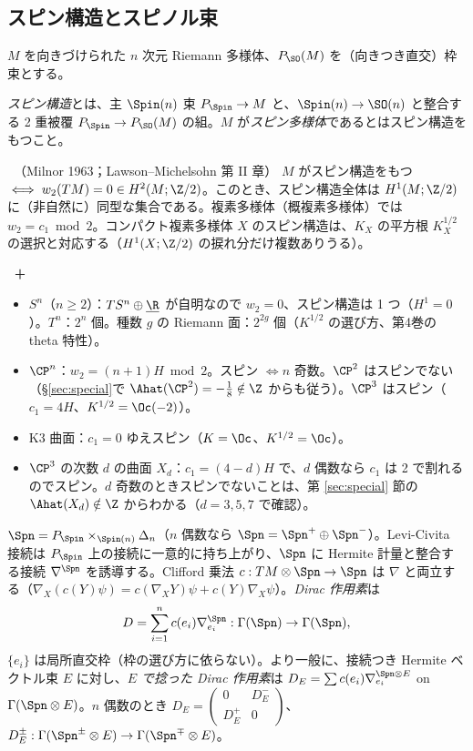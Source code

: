 \subsection{スピン構造とスピノル束}
$M$ を向きづけられた $n$ 次元 Riemann 多様体、$P_{\SO}(M)$ を（向きつき直交）枠束とする。
\begin{defn}[スピン構造]\label{def:spinstr}
\emph{スピン構造}とは、主 $\Spin(n)$ 束 $P_{\Spin}\to M$ と、$\Spin(n)\to\SO(n)$ と整合する 2 重被覆 $P_{\Spin}\to P_{\SO}(M)$ の組。$M$ が\emph{スピン多様体}であるとはスピン構造をもつこと。
\end{defn}
\begin{thm}[スピン構造の存在と分類]\label{thm:spinstr}\tC\ （Milnor 1963；Lawson--Michelsohn 第 II 章）
$M$ がスピン構造をもつ $\iff w_2(TM)=0\in H^2(M;\Z/2)$。このとき、スピン構造全体は $H^1(M;\Z/2)$ に（非自然に）同型な集合である。複素多様体（概複素多様体）では $w_2=c_1\bmod2$。コンパクト複素多様体 $X$ のスピン構造は、$K_X$ の平方根 $K_X^{1/2}$ の選択と対応する（$H^1(X;\Z/2)$ の捩れ分だけ複数ありうる）。
\end{thm}
\begin{ex}\label{ex:spinex}\tC\ ＋\tP\
\begin{itemize}
\item $S^n$（$n\ge2$）：$TS^n\oplus\underline\R$ が自明なので $w_2=0$、スピン構造は 1 つ（$H^1=0$）。$T^n$：$2^n$ 個。種数 $g$ の Riemann 面：$2^{2g}$ 個（$K^{1/2}$ の選び方、第4巻の theta 特性）。
\item $\CP^n$：$w_2=(n+1)H\bmod2$。スピン $\iff n$ 奇数。$\CP^2$ はスピンでない（\S\ref{sec:special}で $\Ahat(\CP^2)=-\frac18\notin\Z$ からも従う）。$\CP^3$ はスピン（$c_1=4H$、$K^{1/2}=\Oc(-2)$）。
\item K3 曲面：$c_1=0$ ゆえスピン（$K=\Oc$、$K^{1/2}=\Oc$）。
\item $\CP^3$ の次数 $d$ の曲面 $X_d$：$c_1=(4-d)H$ で、$d$ 偶数なら $c_1$ は 2 で割れるのでスピン。$d$ 奇数のときスピンでないことは、第 \ref{sec:special} 節の $\Ahat(X_d)\notin\Z$ からわかる（$d=3,5,7$ で確認）。
\end{itemize}
\end{ex}
\begin{defn}\label{def:Dirac}
$\Spn=P_{\Spin}\times_{\Spin(n)}\Delta_n$（$n$ 偶数なら $\Spn=\Spn^+\oplus\Spn^-$）。Levi-Civita 接続は $P_{\Spin}$ 上の接続に一意的に持ち上がり、$\Spn$ に Hermite 計量と整合する接続 $\nabla^{\Spn}$ を誘導する。Clifford 乗法 $c:TM\otimes\Spn\to\Spn$ は $\nabla$ と両立する（$\nabla_X(c(Y)\psi)=c(\nabla_XY)\psi+c(Y)\nabla_X\psi$）。\emph{Dirac 作用素}は
\[
D=\sum_{i=1}^nc(e_i)\nabla^{\Spn}_{e_i}:\Gamma(\Spn)\to\Gamma(\Spn),
\]
$\{e_i\}$ は局所直交枠（枠の選び方に依らない）。より一般に、接続つき Hermite ベクトル束 $E$ に対し、\emph{$E$ で捻った Dirac 作用素}は $D_E=\sum c(e_i)\nabla^{\Spn\otimes E}_{e_i}$ on $\Gamma(\Spn\otimes E)$。$n$ 偶数のとき $D_E=\begin{pmatrix}0&D_E^-\\D_E^+&0\end{pmatrix}$、$D_E^\pm:\Gamma(\Spn^\pm\otimes E)\to\Gamma(\Spn^\mp\otimes E)$。
\end{defn}
